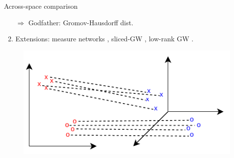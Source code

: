 \documentclass{beamer}
\begin{document}
\begin{frame}{Across-space comparison}
\begin{minipage}[t]{0.5\linewidth}
\begin{enumerate}
  $\Rightarrow$ Godfather: Gromov-Hausdorff dist.
  \item Extensions: measure networks \parencite{Chowdhury19},
  sliced-GW \parencite{Vayer19a}, low-rank GW \parencite{Meyer21b}.
\end{enumerate}
\end{minipage}%
\hfill%
\hspace{-6cm}
\begin{minipage}[t]{0.5\linewidth}
  \vspace{0.5cm}
\begin{figure}
  \centering
  \includegraphics[width=1.15\linewidth, keepaspectratio=true]{OT_new/gw.pdf}
\end{figure}
\end{minipage}

\end{frame}
\end{document}

